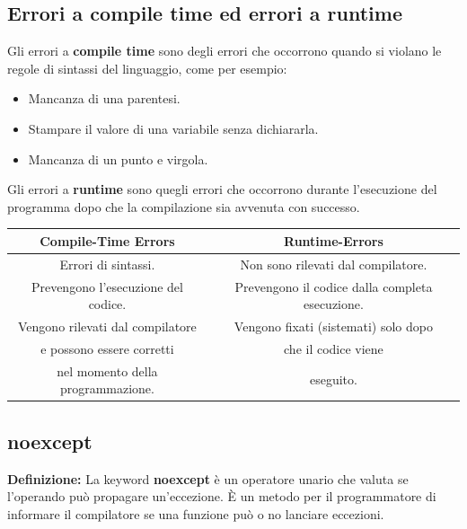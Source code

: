 \subsection{Errori a compile time ed errori a runtime}

\textsf{\small Gli errori a \textbf{compile time} sono degli errori che occorrono quando si violano le regole di sintassi del linguaggio, come per esempio: } \\

\begin{itemize}
	\item \textsf{\small Mancanza di una parentesi.}
	\item \textsf{\small Stampare il valore di una variabile senza dichiararla.}
	\item \textsf{\small Mancanza di un punto e virgola.}
\end{itemize}

\textsf{\small Gli errori a \textbf{runtime} sono quegli errori che occorrono durante l'esecuzione del programma dopo che la compilazione sia avvenuta con successo.} \break

\begin{tabular}{|c|c|}
	\hline
	\textbf{Compile-Time Errors} & \textbf{Runtime-Errors} \\
	\hline
	\textsf{\small Errori di sintassi.} & \textsf{\small Non sono rilevati dal compilatore.} \\
	\hline
	\textsf{\small Prevengono l'esecuzione del codice.} & \textsf{\small Prevengono il codice dalla completa esecuzione.} \\
	\hline
	\textsf{\small Vengono rilevati dal compilatore } & \textsf{\small Vengono fixati (sistemati) solo dopo} \\
	\textsf{\small e possono essere corretti} & \textsf{\small che il codice viene} \\
	\textsf{\small nel momento della programmazione.} & \textsf{\small eseguito.} \\
	\hline
\end{tabular}

\subsection{noexcept}

\textsf{\small \textbf{Definizione: } La keyword \textbf{noexcept} è un operatore unario che valuta se l'operando può propagare un'eccezione. È un metodo per il programmatore di informare il compilatore se una funzione può o no lanciare eccezioni.} \\

